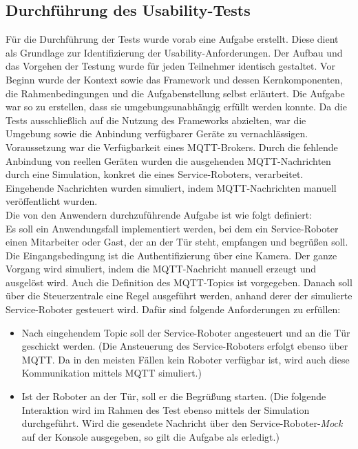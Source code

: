     \subsection{Durchführung des Usability-Tests}
        Für die Durchführung der Tests wurde vorab eine Aufgabe erstellt. Diese 
        dient als Grundlage zur Identifizierung der Usability-Anforderungen. Der Aufbau und das Vorgehen der Testung wurde für jeden Teilnehmer 
        identisch gestaltet. Vor Beginn wurde der Kontext sowie das Framework und dessen Kernkomponenten, die Rahmenbedingungen und die Aufgabenstellung selbst erläutert. 
        Die Aufgabe war so zu erstellen, dass sie umgebungsunabhängig erfüllt werden konnte. 
        Da die Tests ausschließlich auf die Nutzung des Frameworks abzielten, war die Umgebung sowie die 
        Anbindung verfügbarer Geräte zu vernachlässigen. Voraussetzung war die Verfügbarkeit eines \acs{MQTT}-Brokers. 
        Durch die fehlende Anbindung von reellen Geräten wurden die ausgehenden 
        \acs{MQTT}-Nachrichten durch eine Simulation, konkret die eines Service-Roboters, verarbeitet. Eingehende Nachrichten 
        wurden simuliert, indem \acs{MQTT}-Nachrichten manuell veröffentlicht wurden. 
        \\
        Die von den Anwendern durchzuführende Aufgabe ist wie folgt definiert: 
        \\
        \linebreak
        Es soll ein Anwendungsfall implementiert werden, bei dem ein Service-Roboter einen Mitarbeiter oder Gast, der an der Tür steht, 
        empfangen und begrüßen soll. Die Eingangsbedingung ist die Authentifizierung über eine Kamera. Der ganze Vorgang wird simuliert, indem die \acs{MQTT}-Nachricht manuell erzeugt und ausgelöst wird. 
        Auch die Definition des \acs{MQTT}-Topics ist vorgegeben. 
        Danach soll über die Steuerzentrale eine Regel ausgeführt werden, anhand derer der simulierte 
        Service-Roboter gesteuert wird. Dafür sind folgende Anforderungen zu erfüllen: 
        \begin{itemize}
            \item Nach eingehendem Topic soll der Service-Roboter angesteuert und an die Tür geschickt werden. 
            (Die Ansteuerung des Service-Roboters erfolgt ebenso über \acs{MQTT}. Da in den meisten Fällen kein Roboter verfügbar ist, wird auch 
            diese Kommunikation mittels \acs{MQTT} simuliert.)
            \item Ist der Roboter an der Tür, soll er die Begrüßung starten. (Die folgende Interaktion wird im Rahmen des Test ebenso mittels der Simulation durchgeführt. 
            Wird die gesendete Nachricht über den Service-Roboter-\textit{Mock} auf der Konsole ausgegeben, so gilt die Aufgabe als erledigt.)
        \end{itemize}
